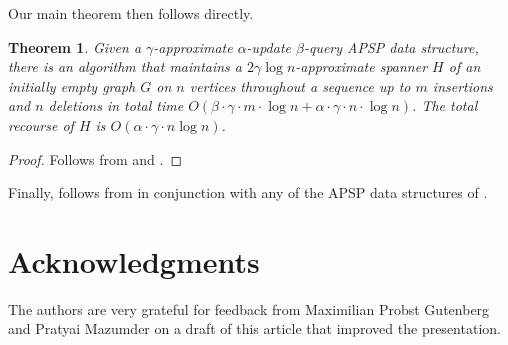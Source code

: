 \documentclass[11pt]{article}
\newtheorem{theorem}{Theorem}[section]
\begin{document}
Our main theorem then follows directly.

\begin{theorem} \label{thm:main_apsp}
    Given a $\gamma$-approximate $\alpha$-update $\beta$-query APSP data structure, there is an algorithm that maintains a $2 \gamma \log n$-approximate spanner $H$ of an initially empty graph $G$ on $n$ vertices throughout a sequence up to $m$ insertions and $n$ deletions in total time $O(\beta \cdot \gamma \cdot m 
\cdot \log n  + \alpha \cdot \gamma \cdot n \cdot \log n)$. The total recourse of $H$ is $O(\alpha \cdot \gamma \cdot n \log n)$. 
\end{theorem}
\begin{proof}
    Follows from  and .
\end{proof}

Finally,  follows from  in conjunction with any of the APSP data structures of \cite{CZ23, kyng2023dynamic, haeupler2024dynamicdeterministicconstantapproximatedistance}. 

\section*{Acknowledgments}

The authors are very grateful for feedback from Maximilian Probst Gutenberg and Pratyai Mazumder on a draft of this article that improved the presentation.  

\newpage


\end{document}
